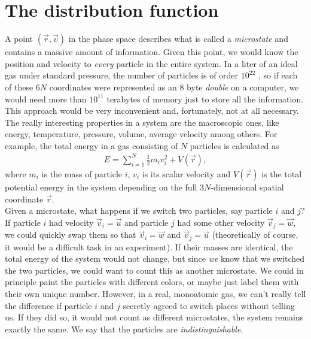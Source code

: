 \section{The distribution function}
\label{sec:kinetic_theory_distribution_function}
A point $(\vec r, \vec v)$ in the phase space describes what is called a \textit{microstate} and contains a massive amount of information. Given this point, we would know the position and velocity to \textit{every} particle in the entire system. In a liter of an ideal gas under standard pressure, the number of particles is of order $10^{22}$ \cite{garcia2000numerical}, so if each of these $6N$ coordinates were represented as an 8 byte \textit{double} on a computer, we would need more than $10^{11}$ terabytes of memory just to store all the information. This approach would be very inconvenient and, fortunately, not at all necessary. The really interesting properties in a system are the macroscopic ones, like energy, temperature, pressure, volume, average velocity among others. For example, the total energy in a gas consisting of $N$ particles is calculated as
\begin{align*}
	E = \sum_{i=1}^N \frac{1}{2} m_i v_i^2 + V(\vec r),
\end{align*}
where $m_i$ is the mass of particle $i$, $v_i$ is its scalar velocity and $V(\vec r)$ is the total potential energy in the system depending on the full $3N$-dimensional spatial coordinate $\vec r$.\\
Given a microstate, what happens if we switch two particles, say particle $i$ and $j$? If particle $i$ had velocity $\vec v_i = \vec u$ and particle $j$ had some other velocity $\vec v_j = \vec w$, we could quickly swap them so that $\vec v_i = \vec w$ and $\vec v_j = \vec u$ (theoretically of course, it would be a difficult task in an experiment). If their masses are identical, the total energy of the system would not change, but since \textit{we} know that we switched the two particles, we could want to count this as another microstate. We could in principle paint the particles with different colors, or maybe just label them with their own unique number. However, in a real, monoatomic gas, we can't really tell the difference if particle $i$ and $j$ secretly agreed to switch places without telling us. If they did so, it would not count as different microstates, the system remains exactly the same. We say that the particles are \textit{indistinguishable}.\\
